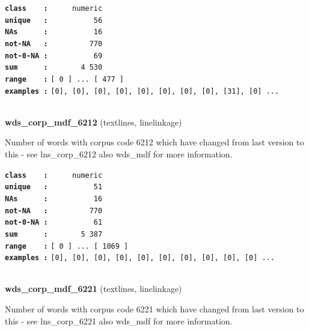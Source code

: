\documentclass[]{article}
\begin{document}
\textbf{\texttt{class\ \ \ \ :}} \texttt{~~~~~numeric}\\
\textbf{\texttt{unique\ \ \ :}} \texttt{~~~~~~~~~~56}\\
\textbf{\texttt{NAs\ \ \ \ \ \ :}} \texttt{~~~~~~~~~~16}\\
\textbf{\texttt{not-NA\ \ \ :}} \texttt{~~~~~~~~~770}\\
\textbf{\texttt{not-0-NA\ :}} \texttt{~~~~~~~~~~69}\\
\textbf{\texttt{sum\ \ \ \ \ \ :}} \texttt{~~~~~~~4~530}\\
\textbf{\texttt{range\ \ \ \ :}}
\texttt{{[}\ 0\ {]}\ ...\ {[}\ 477\ {]}}\\
\textbf{\texttt{examples\ :}}
\texttt{{[}0{]},\ {[}0{]},\ {[}0{]},\ {[}0{]},\ {[}0{]},\ {[}0{]},\ {[}0{]},\ {[}0{]},\ {[}31{]},\ {[}0{]}\ ...}\\

~

\textbf{wds\_corp\_mdf\_6212} (textlines, linelinkage)

Number of words with corpus code 6212 which have changed from last
version to this - see lns\_corp\_6212 also wds\_mdf for more
information.

\textbf{\texttt{class\ \ \ \ :}} \texttt{~~~~~numeric}\\
\textbf{\texttt{unique\ \ \ :}} \texttt{~~~~~~~~~~51}\\
\textbf{\texttt{NAs\ \ \ \ \ \ :}} \texttt{~~~~~~~~~~16}\\
\textbf{\texttt{not-NA\ \ \ :}} \texttt{~~~~~~~~~770}\\
\textbf{\texttt{not-0-NA\ :}} \texttt{~~~~~~~~~~61}\\
\textbf{\texttt{sum\ \ \ \ \ \ :}} \texttt{~~~~~~~5~387}\\
\textbf{\texttt{range\ \ \ \ :}}
\texttt{{[}\ 0\ {]}\ ...\ {[}\ 1069\ {]}}\\
\textbf{\texttt{examples\ :}}
\texttt{{[}0{]},\ {[}0{]},\ {[}0{]},\ {[}0{]},\ {[}0{]},\ {[}0{]},\ {[}0{]},\ {[}0{]},\ {[}0{]},\ {[}0{]}\ ...}\\

~

\textbf{wds\_corp\_mdf\_6221} (textlines, linelinkage)

Number of words with corpus code 6221 which have changed from last
version to this - see lns\_corp\_6221 also wds\_mdf for more
information.
\end{document}
